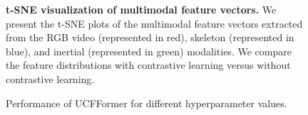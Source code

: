 \begin{figure}[!t]
    \centering
    \captionsetup[subfloat]{labelfont=footnotesize,textfont=footnotesize}
    \quad
         \vspace{2mm}
    \caption{\textbf{t-SNE visualization of multimodal feature vectors.} We present the t-SNE plots of the multimodal feature vectors extracted from the RGB video (represented in red), skeleton (represented in blue), and inertial (represented in green) modalities. We compare the feature distributions with contrastive learning versus without contrastive learning.
    }
    \label{fig6:tsne}
\end{figure}

\begin{figure}[thb]
    \centering
    \captionsetup[subfloat]{labelfont=footnotesize,textfont=footnotesize}
        \vspace{5mm}
     \vspace{5mm}
        \vspace{2mm}
    \caption{Performance of UCFFormer for different hyperparameter values. }
    \label{fig5:transformer_parameter}
\end{figure}

